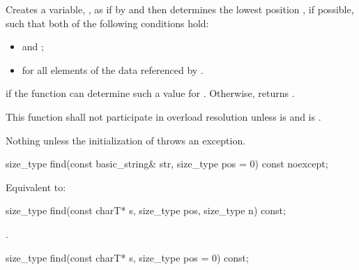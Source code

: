 \begin{itemdescr}
\pnum
\effects
Creates a variable, , as if by
 and then
determines the lowest position , if possible, such that both of
the following conditions hold:
\begin{itemize}
\item
{} and
;
\item
{}%
for all elements  of the data referenced by .
\end{itemize}

\pnum
\returns
{} if the function can determine such a value for .
Otherwise, returns
.

\pnum
\remarks
This function shall not participate in overload resolution unless
 is  and
 is .

\pnum
\throws
Nothing unless the initialization of  throws an exception.
\end{itemdescr}

%
\begin{itemdecl}
size_type find(const basic_string& str, size_type pos = 0) const noexcept;
\end{itemdecl}

\begin{itemdescr}
\pnum
\effects
Equivalent to: 
\end{itemdescr}

%
\begin{itemdecl}
size_type find(const charT* s, size_type pos, size_type n) const;
\end{itemdecl}

\begin{itemdescr}
\pnum
\returns
{}.
\end{itemdescr}

%
\begin{itemdecl}
size_type find(const charT* s, size_type pos = 0) const;
\end{itemdecl}

